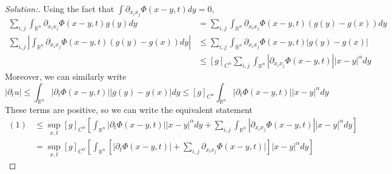 \documentclass{article}
\newcommand{\R}{\mathbb{R}}
\begin{document}
      \begin{proof}[Solution:]
        Using the fact that $\int \partial_{x_ix_j} \Phi(x-y,t)dy = 0$,
        \begin{align*}
          \sum_{i,j}\int_{\R^n}\partial_{x_ix_j}\Phi(x-y,t)g(y)dy &= \sum_{i,j}\int_{\R^n}\partial_{x_ix_j}\Phi(x-y,t)(g(y)-g(x))dy \\
          \sum_{i,j}\left|\int_{\R^n}\partial_{x_ix_j}\Phi(x-y,t)(g(y)-g(x))dy\right| &\le \sum_{i,j}\int_{\R^n}\partial_{x_ix_j}\Phi(x-y,t)|g(y)-g(x)| \\
          &\le [g]_{C^\alpha}\sum_{i,j}\int_{\R^n}|\partial_{x_ix_j}\Phi(x-y,t)||x-y|^\alpha dy
        \end{align*}
        Moreover, we can similarly write 
        \[ |\partial_t u| \le \int_{\R^n} |\partial_t \Phi(x-y,t)||g(y)-g(x)|dy \le [g]_{C^\alpha}\int_{\R^n} |\partial_t \Phi(x-y,t)||x-y|^\alpha dy\]
        These terms are positive, so we can write the equivalent statement 
        \begin{align*}
          (1) &\le \sup_{x,t}[g]_{C^\alpha}\left[\int_{\R^n} |\partial_t \Phi(x-y,t)||x-y|^\alpha dy + \sum_{i,j}\int_{\R^n}|\partial_{x_ix_j}\Phi(x-y,t)||x-y|^\alpha dy\right] \\
          &= \sup_{x,t}[g]_{C^\alpha}\left[\int_{\R^n} \left[|\partial_t \Phi(x-y,t)|+ \sum_{i,j}\partial_{x_ix_j}\Phi(x-y,t)|\right]|x-y|^\alpha dy\right]

\end{align*}
\end{proof}
\end{document}
